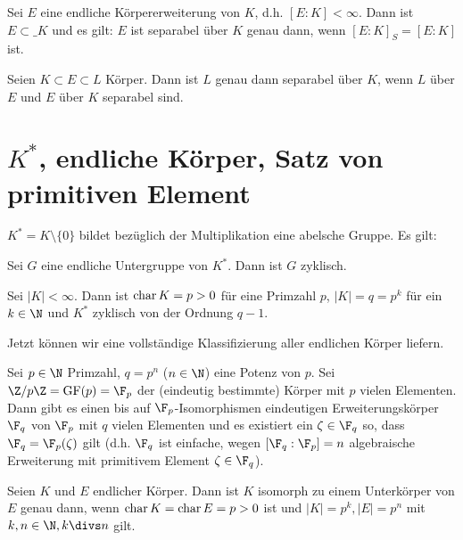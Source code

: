 \begin{st} \label{19.1-19}
	Sei $E$ eine endliche Körpererweiterung von $K$, d.h. $[E : K] < \infty$.
	Dann ist $E \subset \_K$ und es gilt:
	$E$ ist separabel über $K$ genau dann, wenn $[E : K]_S = [E : K]$ ist.
\end{st}

\begin{st} \label{19.1-20}
	Seien $K \subset E \subset L$ Körper.
	Dann ist $L$ genau dann separabel über $K$, wenn $L$ über $E$ und $E$ über $K$ separabel sind.
\end{st}


\section{\texorpdfstring{$K^*$}{K*}, endliche Körper, Satz von primitiven Element}

$K^* = K \setminus \{0\}$ bildet bezüglich der Multiplikation eine abelsche Gruppe.
Es gilt:

\begin{st} \label{19.2-1}
	Sei $G$ eine endliche Untergruppe von $K^*$.
	Dann ist $G$ zyklisch.
\end{st}

\begin{st} \label{19.2-2}
	Sei $|K| < \infty$.
	Dann ist $\operatorname{char} K = p > 0$ für eine Primzahl $p$, $|K| = q = p^k$ für ein $k \in \N$ und $K^*$ zyklisch von der Ordnung $q - 1$.
\end{st}

Jetzt können wir eine vollständige Klassifizierung aller endlichen Körper liefern.

\begin{st} \label{19.2-3}
	Sei $p \in \N$ Primzahl, $q = p^n$ ($n \in \N$) eine Potenz von $p$.
	Sei $\Z / p\Z = \GF(p) = \F_p$ der (eindeutig bestimmte) Körper mit $p$ vielen Elementen.
	Dann gibt es einen bis auf $\F_p$-Isomorphismen eindeutigen Erweiterungskörper $\F_q$ von $\F_p$ mit $q$ vielen Elementen und es existiert ein $\zeta \in \F_q$ so, dass $\F_q = \F_p(\zeta)$ gilt (d.h. $\F_q$ ist einfache, wegen $[\F_q : \F_p] = n$ algebraische Erweiterung mit primitivem Element $\zeta \in \F_q$).
\end{st}

\begin{kor} \label{19.2-4}
	Seien $K$ und $E$ endlicher Körper.
	Dann ist $K$ isomorph zu einem Unterkörper von $E$ genau dann, wenn $\operatorname{char} K = \operatorname{char} E = p > 0$ ist und $|K| = p^k, |E| = p^n$ mit $k, n \in \N, k \divs n$ gilt.
\end{kor}

